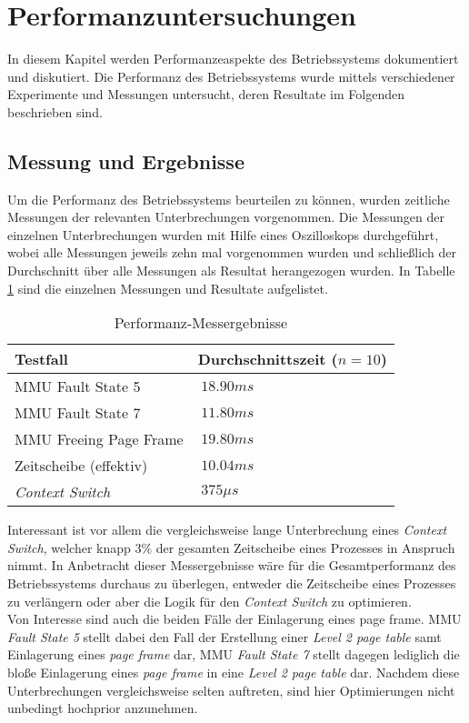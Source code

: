 \section{Performanzuntersuchungen}
\label{Performanz}

In diesem Kapitel werden Performanzeaspekte des Betriebssystems dokumentiert und diskutiert. Die Performanz des Betriebssystems wurde mittels verschiedener Experimente und Messungen untersucht, deren Resultate im Folgenden beschrieben sind.

\subsection{Messung und Ergebnisse}
Um die Performanz des Betriebssystems beurteilen zu können, wurden zeitliche Messungen der relevanten Unterbrechungen vorgenommen. Die Messungen der einzelnen Unterbrechungen wurden mit Hilfe eines Oszilloskops durchgeführt, wobei alle Messungen jeweils zehn mal vorgenommen wurden und schließlich der Durchschnitt über alle Messungen als Resultat herangezogen wurden. In Tabelle \ref{table:osciResults} sind die einzelnen Messungen und Resultate aufgelistet.

\begin{table}[H]
\begin{tabular}{p{7cm} | p{7cm}}
  \textbf{Testfall} & \textbf{Durchschnittszeit ($n=10$)} \\ \hline
  	\ac{MMU} Fault State 5 & $~18.90 ms$ \\
  	\ac{MMU} Fault State 7 & $~11.80 ms$ \\
  	\ac{MMU} Freeing Page Frame & $~19.80 ms$ \\
  	Zeitscheibe (effektiv) & $~10.04 ms$ \\
  	\textit{Context Switch} & $~375 \mu s$ \\
 \end{tabular}
 \caption{Performanz-Messergebnisse}
 \label{table:osciResults}
\end{table}

Interessant ist vor allem die vergleichsweise lange Unterbrechung eines \textit{Context Switch}, welcher knapp $3\%$ der gesamten Zeitscheibe eines Prozesses in Anspruch nimmt. In Anbetracht dieser Messergebnisse wäre für die Gesamtperformanz des Betriebssystems durchaus zu überlegen, entweder die Zeitscheibe eines Prozesses zu verlängern oder aber die Logik für den \textit{Context Switch} zu optimieren.\\
Von Interesse sind auch die beiden Fälle der Einlagerung eines page frame. \ac{MMU} \emph{Fault State 5} stellt dabei den Fall der Erstellung einer \textit{Level 2 page table} samt Einlagerung eines \textit{page frame} dar, \ac{MMU} \emph{Fault State 7} stellt dagegen lediglich die bloße Einlagerung eines \textit{page frame} in eine \textit{Level 2 page table} dar. Nachdem diese Unterbrechungen vergleichsweise selten auftreten, sind hier Optimierungen nicht unbedingt hochprior anzunehmen.

\pagebreak 